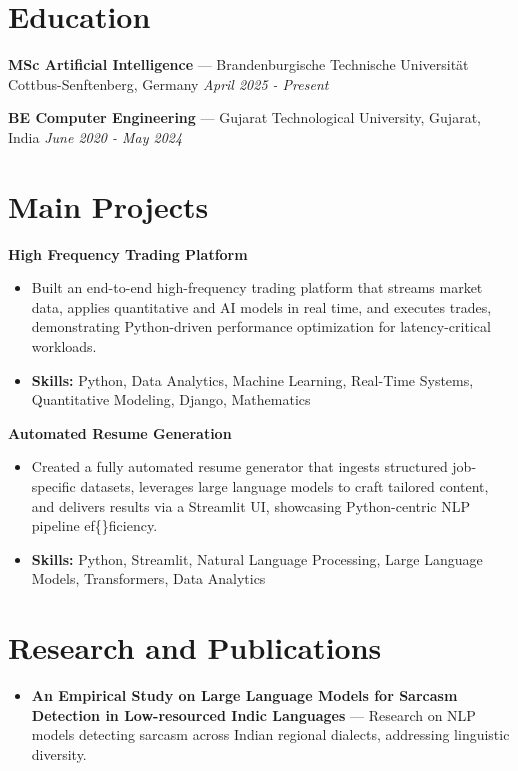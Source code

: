 \documentclass[a4paper,10pt]{article}
\begin{document}
\section*{Education}
\textbf{MSc Artificial Intelligence} — Brandenburgische Technische Universität Cottbus-Senftenberg, Germany \hfill \textit{April 2025 - Present}\par
\vspace{1.5pt}
\textbf{BE Computer Engineering} — Gujarat Technological University, Gujarat, India \hfill \textit{June 2020 - May 2024}\par

\section*{Main Projects}
\textbf{High Frequency Trading Platform}\par
\vspace{1pt}
\begin{itemize}
  \item Built an end-to-end high-frequency trading platform that streams market data, applies quantitative and AI models in real time, and executes trades, demonstrating Python-driven performance optimization for latency-critical workloads.
  \item \textbf{Skills:} Python, Data Analytics, Machine Learning, Real-Time Systems, Quantitative Modeling, Django, Mathematics
\end{itemize}
\vspace{3pt}
\textbf{Automated Resume Generation}\par
\vspace{1pt}
\begin{itemize}
  \item Created a fully automated resume generator that ingests structured job-specific datasets, leverages large language models to craft tailored content, and delivers results via a Streamlit UI, showcasing Python-centric NLP pipeline ef\{\}ficiency.
  \item \textbf{Skills:} Python, Streamlit, Natural Language Processing, Large Language Models, Transformers, Data Analytics
\end{itemize}

\section*{Research and Publications}
\begin{itemize}
\item \textbf{An Empirical Study on Large Language Models for Sarcasm Detection in Low-resourced Indic Languages} — Research on NLP models detecting sarcasm across Indian regional dialects, addressing linguistic diversity.
\end{itemize}
\end{document}
